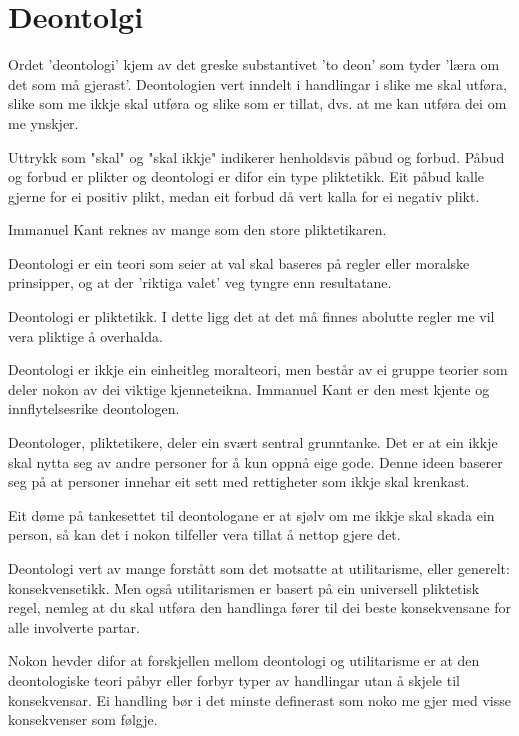 \documentclass[a4paper]{IEEEtran}
\begin{document}
\bigskip
\section{Deontolgi}
\label{deontologi}\bigskip

Ordet 'deontologi' kjem av det greske substantivet 'to deon' som tyder 'læra om det som må gjerast'. Deontologien vert inndelt i handlingar i slike me skal utføra, slike som me ikkje skal utføra og slike som er tillat, dvs. at me kan utføra dei om me ynskjer.\bigskip

Uttrykk som "skal" og "skal ikkje" indikerer henholdsvis påbud og forbud. Påbud og forbud er plikter og deontologi er difor ein type pliktetikk. Eit påbud kalle gjerne for ei positiv plikt, medan eit forbud då vert kalla for ei negativ plikt.\bigskip

Immanuel Kant reknes av mange som den store pliktetikaren.\bigskip

Deontologi er ein teori som seier at val skal baseres på regler eller moralske prinsipper, og at der 'riktiga valet' veg tyngre enn resultatane.\bigskip

Deontologi er pliktetikk. I dette ligg det at det må finnes abolutte regler me vil vera pliktige å overhalda. \bigskip

Deontologi er ikkje ein einheitleg moralteori, men består av ei gruppe teorier som deler nokon av dei viktige kjenneteikna. Immanuel Kant er den mest kjente og innflytelsesrike deontologen.\bigskip

Deontologer, pliktetikere, deler ein svært sentral grunntanke. Det er at ein ikkje skal nytta seg av andre personer for å kun oppnå eige gode. Denne ideen baserer seg på at personer innehar eit sett med rettigheter som ikkje skal krenkast. \bigskip

Eit døme på tankesettet til deontologane er at sjølv om me ikkje skal skada ein person, så kan det i nokon tilfeller vera tillat å nettop gjere det. \bigskip

Deontologi vert av mange forstått som det motsatte at utilitarisme, eller generelt: konsekvensetikk. Men også utilitarismen er basert på ein universell pliktetisk regel, nemleg at du skal utføra den handlinga fører til dei beste konsekvensane for alle involverte partar.\bigskip

Nokon hevder difor at forskjellen mellom deontologi og utilitarisme er at den deontologiske teori påbyr eller forbyr typer av handlingar utan å skjele til konsekvensar. Ei handling bør i det minste definerast som noko me gjer med visse konsekvenser som følgje.\bigskip
\end{document}
